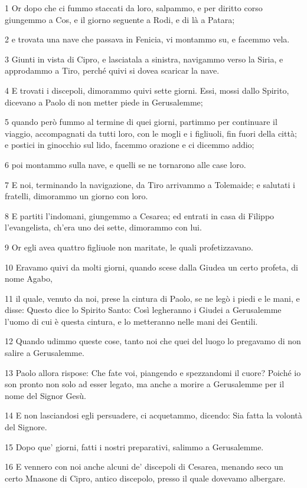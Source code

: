\par 1 Or dopo che ci fummo staccati da loro, salpammo, e per diritto corso giungemmo a Cos, e il giorno seguente a Rodi, e di là a Patara;
\par 2 e trovata una nave che passava in Fenicia, vi montammo su, e facemmo vela.
\par 3 Giunti in vista di Cipro, e lasciatala a sinistra, navigammo verso la Siria, e approdammo a Tiro, perché quivi si dovea scaricar la nave.
\par 4 E trovati i discepoli, dimorammo quivi sette giorni. Essi, mossi dallo Spirito, dicevano a Paolo di non metter piede in Gerusalemme;
\par 5 quando però fummo al termine di quei giorni, partimmo per continuare il viaggio, accompagnati da tutti loro, con le mogli e i figliuoli, fin fuori della città; e postici in ginocchio sul lido, facemmo orazione e ci dicemmo addio;
\par 6 poi montammo sulla nave, e quelli se ne tornarono alle case loro.
\par 7 E noi, terminando la navigazione, da Tiro arrivammo a Tolemaide; e salutati i fratelli, dimorammo un giorno con loro.
\par 8 E partiti l'indomani, giungemmo a Cesarea; ed entrati in casa di Filippo l'evangelista, ch'era uno dei sette, dimorammo con lui.
\par 9 Or egli avea quattro figliuole non maritate, le quali profetizzavano.
\par 10 Eravamo quivi da molti giorni, quando scese dalla Giudea un certo profeta, di nome Agabo,
\par 11 il quale, venuto da noi, prese la cintura di Paolo, se ne legò i piedi e le mani, e disse: Questo dice lo Spirito Santo: Così legheranno i Giudei a Gerusalemme l'uomo di cui è questa cintura, e lo metteranno nelle mani dei Gentili.
\par 12 Quando udimmo queste cose, tanto noi che quei del luogo lo pregavamo di non salire a Gerusalemme.
\par 13 Paolo allora rispose: Che fate voi, piangendo e spezzandomi il cuore? Poiché io son pronto non solo ad esser legato, ma anche a morire a Gerusalemme per il nome del Signor Gesù.
\par 14 E non lasciandosi egli persuadere, ci acquetammo, dicendo: Sia fatta la volontà del Signore.
\par 15 Dopo que' giorni, fatti i nostri preparativi, salimmo a Gerusalemme.
\par 16 E vennero con noi anche alcuni de' discepoli di Cesarea, menando seco un certo Mnasone di Cipro, antico discepolo, presso il quale dovevamo albergare.
